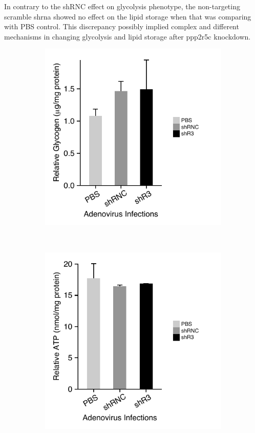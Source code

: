 In contrary to the shRNC effect on glycolysis phenotype, the non-targeting scramble \gls{shrna} showed no effect on the lipid storage when that was comparing with PBS control. This discrepancy possibly implied complex and different mechanisms in changing glycolysis and lipid storage after \gls{ppp2r5c} knockdown. 

\begin{figure}[htbp]
\centering
	\begin{subfigure}[t]{0.48\textwidth}
	\includegraphics[width=1\textwidth]{figs/fig2-17a 1st hepa glycogen.pdf}
    \label{fig:fig2.17a}
	\end{subfigure} %
~
	\begin{subfigure}[t]{0.48\textwidth}
	\includegraphics[width=1\textwidth]{figs/fig2-17b 1st hepa atp.pdf}

\end{subfigure}
\end{figure}
